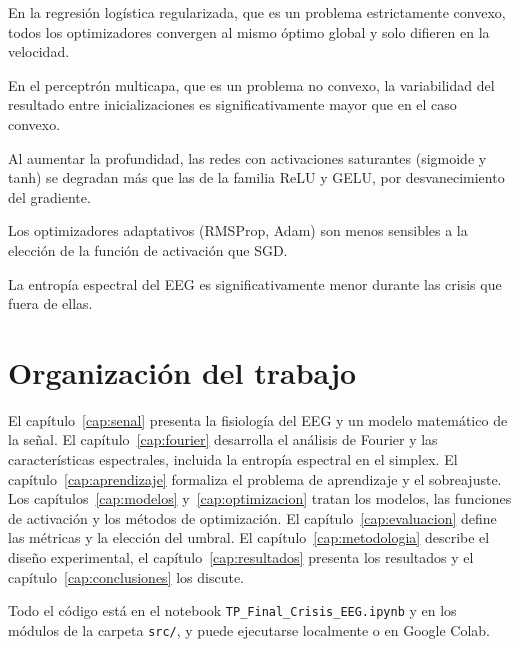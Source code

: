 \begin{hipotesis}\label{h:convexo}
En la regresión logística regularizada, que es un problema estrictamente convexo, todos los optimizadores convergen al mismo óptimo global y solo difieren en la velocidad.
\end{hipotesis}
\begin{hipotesis}\label{h:noconvexo}
En el perceptrón multicapa, que es un problema no convexo, la variabilidad del resultado entre inicializaciones es significativamente mayor que en el caso convexo.
\end{hipotesis}
\begin{hipotesis}\label{h:profundidad}
Al aumentar la profundidad, las redes con activaciones saturantes (sigmoide y tanh) se degradan más que las de la familia ReLU y GELU, por desvanecimiento del gradiente.
\end{hipotesis}
\begin{hipotesis}\label{h:adaptativos}
Los optimizadores adaptativos (RMSProp, Adam) son menos sensibles a la elección de la función de activación que SGD.
\end{hipotesis}
\begin{hipotesis}\label{h:entropia}
La entropía espectral del EEG es significativamente menor durante las crisis que fuera de ellas.
\end{hipotesis}

\section{Organización del trabajo}

El capítulo~\ref{cap:senal} presenta la fisiología del EEG y un modelo matemático de la señal. El capítulo~\ref{cap:fourier} desarrolla el análisis de Fourier y las características espectrales, incluida la entropía espectral en el simplex. El capítulo~\ref{cap:aprendizaje} formaliza el problema de aprendizaje y el sobreajuste. Los capítulos~\ref{cap:modelos} y~\ref{cap:optimizacion} tratan los modelos, las funciones de activación y los métodos de optimización. El capítulo~\ref{cap:evaluacion} define las métricas y la elección del umbral. El capítulo~\ref{cap:metodologia} describe el diseño experimental, el capítulo~\ref{cap:resultados} presenta los resultados y el capítulo~\ref{cap:conclusiones} los discute.

Todo el código está en el notebook \texttt{TP\_Final\_Crisis\_EEG.ipynb} y en los módulos de la carpeta \texttt{src/}, y puede ejecutarse localmente o en Google Colab.
